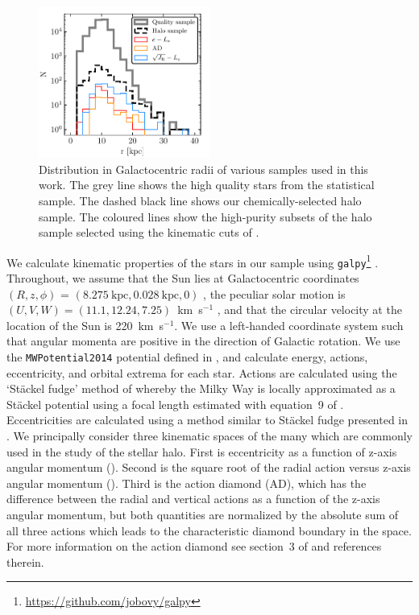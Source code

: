 \begin{figure}
    \centering
    \includegraphics[width=0.5\textwidth]{figure/ch3/radius_histogram.pdf}
    \caption{Distribution in Galactocentric radii of various samples used in this work. The grey line shows the high quality stars from the statistical sample. The dashed black line shows our chemically-selected halo sample. The coloured lines show the high-purity \gse subsets of the halo sample selected using the kinematic cuts of \cite{lane22}.}
    \label{ch3:fig:radius_histogram}
\end{figure}

We calculate kinematic properties of the stars in our sample using \texttt{galpy}\footnote{\url{https://github.com/jobovy/galpy}} \parencite{bovy15}. Throughout, we assume that the Sun lies at Galactocentric coordinates $(R,z,\phi)$ = $(8.275~\text{kpc}, 0.028~\text{kpc}, 0)$ \parencite{gravity21,bennett19}, the peculiar solar motion is $(U,V,W) = (11.1, 12.24, 7.25)$~km~s$^{-1}$ \parencite{schoenrich10}, and that the circular velocity at the location of the Sun is 220~km~s$^{-1}$. We use a left-handed coordinate system such that angular momenta are positive in the direction of Galactic rotation. We use the \texttt{MWPotential2014} potential defined in \textcite{bovy15}, and calculate energy, actions, eccentricity, and orbital extrema for each star. Actions are calculated using the `St\"{a}ckel fudge' method of \textcite{binney12} whereby the Milky Way is locally approximated as a St\"{a}ckel potential using a focal length estimated with equation~9 of \textcite{sanders12}. Eccentricities are calculated using a method similar to St\"{a}ckel fudge presented in \textcite{mackereth18c}. We principally consider three kinematic spaces of the many which are commonly used in the study of the stellar halo. First is eccentricity as a function of z-axis angular momentum (\eLz). Second is the square root of the radial action versus z-axis angular momentum (\JRLz). Third is the action diamond (AD), which has the difference between the radial and vertical actions as a function of the z-axis angular momentum, but both quantities are normalized by the absolute sum of all three actions which leads to the characteristic diamond boundary in the space. For more information on the action diamond see section~3 of \cite{lane22} and references therein.

